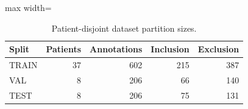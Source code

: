 \begin{table}[t]
\centering
\caption{Patient-disjoint dataset partition sizes.}
\label{tab:split}
\begin{adjustbox}{max width=\columnwidth}
\begin{tabular}{lrrrr}
\toprule
Split & Patients & Annotations & Inclusion & Exclusion \\
\midrule
TRAIN & 37 & 602 & 215 & 387 \\
VAL & 8 & 206 & 66 & 140 \\
TEST & 8 & 206 & 75 & 131 \\
\bottomrule
\end{tabular}
\end{adjustbox}
\end{table}
